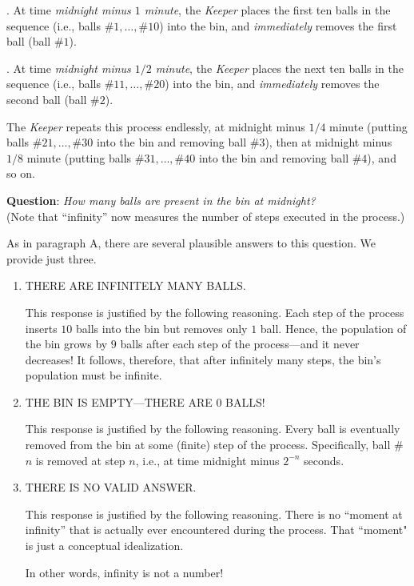 \smallskip

.
At time {\em midnight minus $1$ minute}, the {\it Keeper} places the first ten balls in the sequence (i.e., balls $\#1, \ldots, \#10$) into the bin, and {\em immediately} removes the first ball (ball \#$1$).

\smallskip

.
At time {\em midnight minus $1/2$ minute}, the {\it Keeper} places the next ten balls in the sequence
(i.e., balls $\#11, \ldots, \#20$) into the bin, and {\em immediately} removes the second ball (ball \#$2$).

\smallskip

\noindent
The {\it Keeper} repeats this process endlessly, at midnight minus $1/4$ minute (putting balls $\#21, \ldots, \#30$ into the bin and removing ball \#$3$), then at midnight minus $1/8$ minute (putting
balls $\#31, \ldots, \#40$ into the bin and removing ball \#$4$), and so on.

\smallskip

\noindent
{\bf Question}: {\it How many balls are present in the bin at midnight?}  \\
(Note that ``infinity'' now measures the number of steps executed in the process.)

\medskip

\noindent
As in paragraph {\small\sf A}, there are several plausible answers to this question.  We provide just three.
\begin{enumerate}
\item
THERE ARE INFINITELY MANY BALLS.

\smallskip

This response is justified by the following reasoning.  Each step of the process inserts $10$ balls into the bin but removes only $1$ ball.  Hence, the population of the bin grows by $9$ balls after each step of the process---and it never decreases!  It follows, therefore, that after infinitely many steps, the bin's population must be infinite.

\medskip\item
THE BIN IS EMPTY---THERE ARE $0$ BALLS!

\smallskip

This response is justified by the following reasoning.  Every ball is eventually removed from the bin at some (finite) step of the process. Specifically, ball \#$n$ is removed at step $n$, i.e., at time midnight minus $2^{-n}$ seconds.

\medskip\item
THERE IS NO VALID ANSWER.

\smallskip

This response is justified by the following reasoning.  There is no ``moment at infinity'' that is actually ever encountered during the process.  That ``moment" is just a conceptual idealization.

\smallskip

In other words, infinity is not a number!
\end{enumerate}


